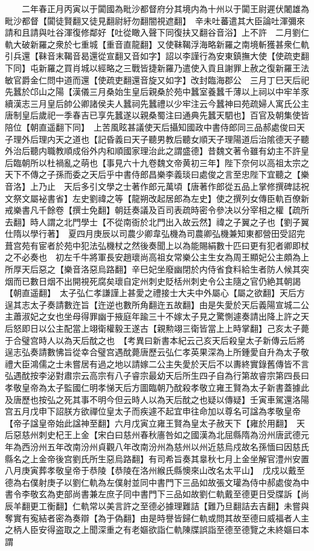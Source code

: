 　　二年春正月丙寅以于闐國為毗沙都督府分其境内為十州以于闐王尉遲伏闍雄為毗沙都督【闐徒賢翻又徒見翻尉紆勿翻闇視遮翻】　辛未吐蕃遣其大臣論吐渾彌來請和且請與吐谷渾復修鄰好【吐從瞰入聲下同復扶又翻谷音浴】上不許　二月劉仁軌大破新羅之衆於七重城【重音直龍翻】又使靺鞨浮海略新羅之南境斬獲甚衆仁軌引兵還【靺音末鞨音曷還從宣翻又音如字】詔以李謹行為安東鎮撫大使【使疏吏翻下同】屯新羅之買肖城以經略之三戰皆捷新羅乃遣使入貢且謝罪上赦之復新羅王法敏官爵金仁問中道而還【使疏吏翻還音旋又如字】改封臨海郡公　三月丁巳天后祀先蠶於邙山之陽【漢儀三月桑始生皇后親桑於苑中蠶室養蠶千薄以上祠以中牢羊豕續漢志三月皇后帥公卿諸侯夫人蠶祠先蠶禮以少牢注云今蠶神曰苑疏婦人寓氏公主唐制皇后歲祀一季春吉已享先蠶遂以親桑蜀注曰通典先蠶天駟也】百官及朝集使皆陪位【朝直遥翻下同】　上苦風眩甚議使天后攝知國政中書侍郎同三品郝處俊曰天子理外后理内天之道也【記昏義曰天子聽男教后聽女順天子理陽道后治隂德天子聽外治后聽内職教順成俗外内和順國家理治此之謂盛德】昔魏文著令雖有幼主不許皇后臨朝所以杜禍亂之萌也【事見六十九卷魏文帝黄初三年】陛下奈何以高祖太宗之天下不傳之子孫而委之天后乎中書侍郎昌樂李義琰曰處俊之言至忠陛下宜聽之【樂音洛】上乃止　天后多引文學之士著作郎元萬頃【唐著作郎從五品上掌修撰碑誌祝文祭文屬袐書省】左史劉禕之等【龍朔改起居郎為左史】使之撰列女傳臣軌百僚新戒樂書凡千餘卷【撰士免翻】朝廷奏議及百司表疏時密令參决以分宰相之權【疏所去翻】時人謂之北門學士【不從南衙於北門出入故云然】禕之子翼之子也【劉子翼仕隋以學行著】　夏四月庚辰以司農少卿韋弘機為司農卿弘機兼知東都營田受詔完葺宫苑有宦者於苑中犯法弘機杖之然後奏聞上以為能賜絹數十匹曰更有犯者卿即杖之不必奏也　初左千牛將軍長安趙瓌尚高祖女常樂公主生女為周王顯妃公主頗為上所厚天后惡之【樂音洛惡烏路翻】辛巳妃坐廢幽閉於内侍省食料給生者防人候其突烟而已數日烟不出開視死腐矣瓌自定州刺史貶栝州刺史令公主隨之官仍絶其朝謁【朝直遥翻】　太子弘仁孝謙謹上甚愛之禮接士大夫中外屬心【屬之欲翻】天后方逞其志太子奏請數迕旨【迕逆也數所角翻迕五故翻】由是失愛於天后義陽宣城二公主蕭淑妃之女也坐母得罪幽于掖庭年踰三十不嫁太子見之驚惻遽奏請出降上許之天后怒即日以公主配當上翊衛權毅王遂古【親勲翊三衛皆當上上時掌翻】己亥太子薨于合璧宫時人以為天后酖之也　【考異曰新書本紀云己亥天后殺皇太子新傳云后將逞志弘奏請數怫旨從幸合璧宫遇酖薨唐歷云弘仁孝英果深為上所鍾愛自升為太子敬禮大臣鴻儒之士未嘗居有過之地以請嫁二公主失愛於天后不以夀終實錄舊傳皆不言弘遇酖按李泌對肅宗云高宗有八子睿宗最幼天后所生四子自為行第故睿宗第四長曰孝敬皇帝為太子監國仁明孝悌天后方圖臨朝乃酖殺孝敬立雍王賢為太子新書蓋據此及唐歷也按弘之死其事不明今但云時人以為天后酖之也疑以傳疑】壬寅車駕還洛陽宫五月戊申下詔朕方欲禪位皇太子而疾遽不起宜申往命加以尊名可諡為孝敬皇帝【帝子諡皇帝始此諡神至翻】六月戊寅立雍王賢為皇太子赦天下【雍於用翻】　天后惡慈州刺史杞王上金【宋白曰慈州春秋廧咎如之國漢為北屈縣隋為汾州唐武德元年為西汾州五年改南汾州貞觀八年改南汾州為慈州以州近慈烏戍故名孫愐曰因慈氏縣名之上金帝後宫劉氏所生惡烏路翻】有司希旨奏其辠秋七月上金坐解官澧州安置　八月庚寅葬孝敬皇帝于恭陵【恭陵在洛州緱氏縣懊來山改名太平山】　戊戍以戴至德為右僕射庚子以劉仁軌為左僕射並同中書門下三品如故張文瓘為侍中郝處俊為中書令李敬玄為吏部尚書兼左庶子同中書門下三品如故劉仁軌戴至德更日受牒訴【尚辰羊翻更工衡翻】仁軌常以美言許之至德必據理難詰【難乃旦翻詰去吉翻】未嘗與奪實有寃結者密為奏辯【為于偽翻】由是時譽皆歸仁軌或問其故至德曰威福者人主之柄人臣安得盗取之上聞深重之有老嫗欲詣仁軌陳牒誤詣至德至德覽之未終嫗曰本謂